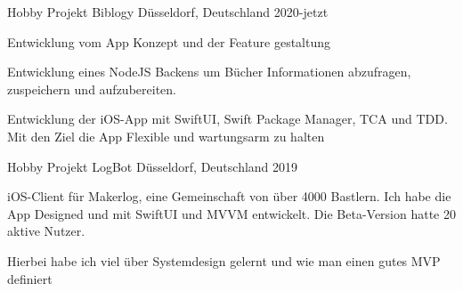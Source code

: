 

\begin{cventries}

  \cventry
    {Hobby Projekt} %
    {Biblogy} %
    {Düsseldorf, Deutschland} %
    {2020-jetzt} %
    {
      \begin{cvitems} %
      	\item {Entwicklung vom App Konzept und der Feature gestaltung}
      	\item {Entwicklung eines NodeJS Backens um Bücher Informationen abzufragen, zuspeichern und aufzubereiten.}
      	\item {Entwicklung der iOS-App mit SwiftUI, Swift Package Manager, TCA und TDD. Mit den Ziel die App Flexible und wartungsarm zu halten}
      \end{cvitems}
    }

  \cventry
    {Hobby Projekt} %
    {LogBot} %
    {Düsseldorf, Deutschland} %
    {2019} %
    {
      \begin{cvitems} %
        \item {iOS-Client für Makerlog, eine Gemeinschaft von über 4000 Bastlern. Ich habe die App Designed und mit SwiftUI und MVVM entwickelt. Die Beta-Version hatte 20 aktive Nutzer.}
		\item {Hierbei habe ich viel über Systemdesign gelernt und wie man einen gutes MVP definiert}
      \end{cvitems}
    }
	

\end{cventries}
